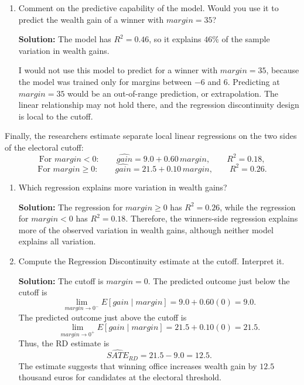 \documentclass[11pt]{exam}
\begin{document}
\begin{questions}
\begin{enumerate}[leftmargin = 0.5cm, label = (\alph*), rightmargin = 0.2cm]
    \item Comment on the predictive capability of the model. Would you use it to predict the wealth gain of a winner with $margin=35$?

    \begin{solutionorbox}[6cm]
    \textbf{Solution:} The model has $R^2=0.46$, so it explains $46\%$ of the sample variation in wealth gains.

    I would not use this model to predict for a winner with $margin=35$, because the model was trained only for margins between $-6$ and $6$. Predicting at $margin=35$ would be an out-of-range prediction, or extrapolation. The linear relationship may not hold there, and the regression discontinuity design is local to the cutoff.
    \end{solutionorbox}
\end{enumerate}

\question[2]
Finally, the researchers estimate separate local linear regressions on the two sides of the electoral cutoff:
\[
\text{For } margin<0: \qquad \widehat{gain}=9.0+0.60\,margin, \qquad R^2=0.18,
\]
\[
\text{For } margin\geq 0: \qquad \widehat{gain}=21.5+0.10\,margin, \qquad R^2=0.26.
\]

\begin{enumerate}[leftmargin = 0.5cm, label = (\alph*), rightmargin = 0.2cm]
    \item Which regression explains more variation in wealth gains?

    \begin{solutionorbox}[3.8cm]
    \textbf{Solution:} The regression for $margin\geq 0$ has $R^2=0.26$, while the regression for $margin<0$ has $R^2=0.18$. Therefore, the winners-side regression explains more of the observed variation in wealth gains, although neither model explains all variation.
    \end{solutionorbox}

    \item Compute the Regression Discontinuity estimate at the cutoff. Interpret it.

    \begin{solutionorbox}[5.5cm]
    \textbf{Solution:} The cutoff is $margin=0$. The predicted outcome just below the cutoff is
    \[
    \lim_{margin\to 0^-}E[gain\mid margin]=9.0+0.60(0)=9.0.
    \]
    The predicted outcome just above the cutoff is
    \[
    \lim_{margin\to 0^+}E[gain\mid margin]=21.5+0.10(0)=21.5.
    \]
    Thus, the RD estimate is
    \[
    \widehat{SATE}_{RD}=21.5-9.0=12.5.
    \]
    The estimate suggests that winning office increases wealth gain by $12.5$ thousand euros for candidates at the electoral threshold.
    \end{solutionorbox}


\end{enumerate}
\end{questions}
\end{document}
